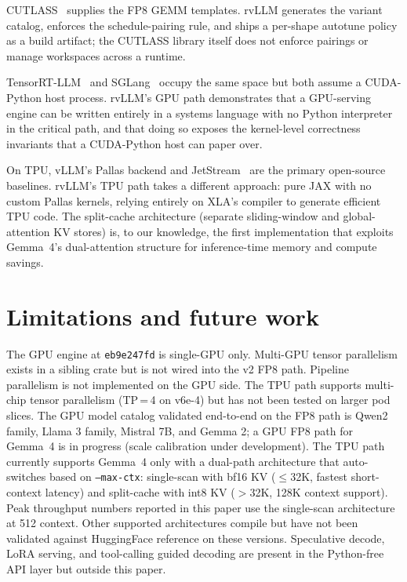 CUTLASS~\cite{cutlass2024} supplies the FP8 GEMM templates. rvLLM
generates the variant catalog, enforces the schedule-pairing rule, and
ships a per-shape autotune policy as a build artifact; the CUTLASS
library itself does not enforce pairings or manage workspaces across a
runtime.

TensorRT-LLM~\cite{tensorrt_llm} and SGLang~\cite{sglang2024} occupy the
same space but both assume a CUDA-Python host process. rvLLM's GPU path
demonstrates that a GPU-serving engine can be written entirely in a
systems language with no Python interpreter in the critical path, and
that doing so exposes the kernel-level correctness invariants that a
CUDA-Python host can paper over.

On TPU, vLLM's Pallas backend and JetStream~\cite{jetstream2024} are the
primary open-source baselines. rvLLM's TPU path takes a different
approach: pure JAX with no custom Pallas kernels, relying entirely on
XLA's compiler to generate efficient TPU code. The split-cache
architecture (separate sliding-window and global-attention KV stores)
is, to our knowledge, the first implementation that exploits Gemma~4's
dual-attention structure for inference-time memory and compute savings.

\section{Limitations and future work}
\label{sec:limitations}

The GPU engine at \texttt{eb9e247fd} is single-GPU only. Multi-GPU
tensor parallelism exists in a sibling crate but is not wired into the
v2 FP8 path. Pipeline parallelism is not implemented on the GPU side.
The TPU path supports multi-chip tensor parallelism (TP\,=\,4 on v6e-4)
but has not been tested on larger pod slices. The GPU model catalog
validated end-to-end on the FP8 path is Qwen2 family, Llama 3 family,
Mistral 7B, and Gemma 2; a GPU FP8 path for Gemma~4 is in progress
(scale calibration under development). The TPU path currently supports
Gemma~4 only with a dual-path architecture that auto-switches based on
\texttt{--max-ctx}: single-scan with bf16 KV ($\le$32K, fastest
short-context latency) and split-cache with int8 KV ($>$32K, 128K
context support). Peak throughput numbers reported in this paper use
the single-scan architecture at 512 context. Other supported architectures compile but
have not been validated against HuggingFace reference on these versions.
Speculative decode, LoRA serving, and tool-calling guided decoding are
present in the Python-free API layer but outside this paper.


